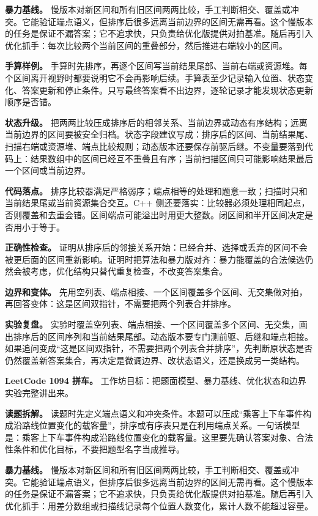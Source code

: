 \textbf{暴力基线。} 慢版本对新区间和所有旧区间两两比较，手工判断相交、覆盖或冲突。它能验证端点语义，但排序后很多远离当前边界的区间无需再看。这个慢版本的任务是保证不漏答案；它不追求快，只负责给优化版提供对拍基准。随后再引入优化抓手：每次比较两个当前区间的重叠部分，然后推进右端较小的区间。

\textbf{手算样例。} 手算时先排序，再逐个区间写当前结果尾部、当前右端或资源堆。每个区间离开视野时都要说明它不会再影响后续。手算表至少记录输入位置、状态变化、答案更新和停止条件。只写最终答案看不出边界，逐轮记录才能发现状态更新顺序是否错。

\textbf{状态升级。} 把两两比较压成排序后的相邻关系、当前边界或动态有序结构；远离当前边界的区间要被安全归档。状态字段建议写成：排序后的区间、当前结果尾、扫描右端或资源堆、端点比较规则；动态版本还要保存前驱后继。不变量要落到代码上：结果数组中的区间已经互不重叠且有序；当前扫描区间只可能影响结果最后一个区间或当前边界。

\textbf{代码落点。} 排序比较器满足严格弱序；端点相等的处理和题意一致；扫描时只和当前结果尾或当前资源集合交互。C++ 侧还要落实：比较器必须处理相同起点，否则覆盖和去重会错。区间端点可能溢出时用更大整数。闭区间和半开区间决定是否用小于等于。

\textbf{正确性检查。} 证明从排序后的邻接关系开始：已经合并、选择或丢弃的区间不会被更后面的区间重新影响。证明时把算法和暴力版对齐：暴力能覆盖的合法候选仍然会被考虑，优化结构只替代重复检查，不改变答案集合。

\textbf{边界和变体。} 先用空列表、端点相接、一个区间覆盖多个区间、无交集做对拍，再回答变体：这是区间双指针，不需要把两个列表合并排序。

\textbf{实验复盘。} 实验时覆盖空列表、端点相接、一个区间覆盖多个区间、无交集，画出排序后的区间序列和当前结果尾部。动态版本要专门测前驱、后继和端点相接。如果追问变成“这是区间双指针，不需要把两个列表合并排序”，先判断原状态是否仍然覆盖新答案集合，再决定是微调边界、改状态语义，还是换成另一类结构。

\noindent\textbf{LeetCode 1094 拼车。} 工作坊目标：把题面模型、暴力基线、优化状态和边界实验完整讲出来。

\textbf{读题拆解。} 读题时先定义端点语义和冲突条件。本题可以压成“乘客上下车事件构成沿路线位置变化的载客量”，排序或有序表只是在利用端点关系。一句话模型是：乘客上下车事件构成沿路线位置变化的载客量。这里要先确认答案对象、合法性条件和优化目标，不要把题型名字当成推导。

\textbf{暴力基线。} 慢版本对新区间和所有旧区间两两比较，手工判断相交、覆盖或冲突。它能验证端点语义，但排序后很多远离当前边界的区间无需再看。这个慢版本的任务是保证不漏答案；它不追求快，只负责给优化版提供对拍基准。随后再引入优化抓手：用差分数组或扫描线记录每个位置人数变化，累计人数不能超过容量。

